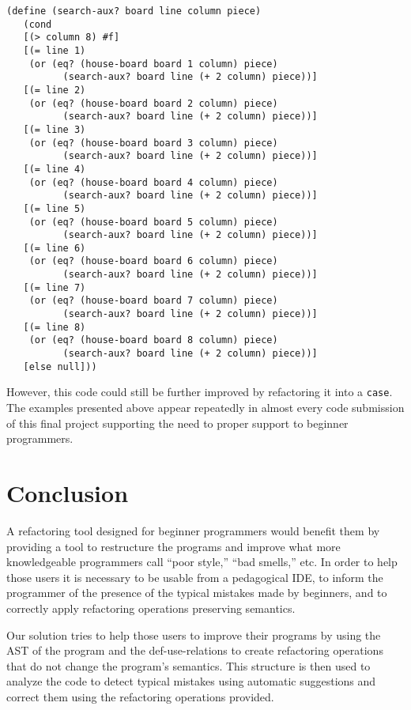 \begin{lstlisting}[basicstyle=\ttfamily]
  (define (search-aux? board line column piece)
   (cond
   [(> column 8) #f]
   [(= line 1)
    (or (eq? (house-board board 1 column) piece)
          (search-aux? board line (+ 2 column) piece))]
   [(= line 2)
    (or (eq? (house-board board 2 column) piece)
          (search-aux? board line (+ 2 column) piece))]
   [(= line 3)
    (or (eq? (house-board board 3 column) piece)
          (search-aux? board line (+ 2 column) piece))]
   [(= line 4)
    (or (eq? (house-board board 4 column) piece)
          (search-aux? board line (+ 2 column) piece))]
   [(= line 5)
    (or (eq? (house-board board 5 column) piece)
          (search-aux? board line (+ 2 column) piece))]
   [(= line 6)
    (or (eq? (house-board board 6 column) piece)
          (search-aux? board line (+ 2 column) piece))]
   [(= line 7)
    (or (eq? (house-board board 7 column) piece)
          (search-aux? board line (+ 2 column) piece))]
   [(= line 8)
    (or (eq? (house-board board 8 column) piece)
          (search-aux? board line (+ 2 column) piece))]
   [else null]))
\end{lstlisting}

However, this code could still be further improved by refactoring it into a {\tt case}. \\


The examples presented above appear repeatedly in almost every code submission of this final project supporting the need to
proper support to beginner programmers.


\section{Conclusion}
A refactoring tool designed for beginner programmers would benefit them
by providing a tool to restructure the programs and improve what more knowledgeable programmers call ``poor style,''
``bad smells,'' etc.
In order to help those users it is necessary to be usable from a pedagogical IDE,
to inform the programmer of the presence of the typical mistakes made by beginners, and
to correctly apply refactoring operations preserving semantics.

Our solution tries to help those users to improve their programs by using the AST of
the program and the def-use-relations to create refactoring operations that do not
change the program's semantics. This structure is then used to analyze the code
to detect typical mistakes using automatic suggestions and correct them using the
refactoring operations provided.



